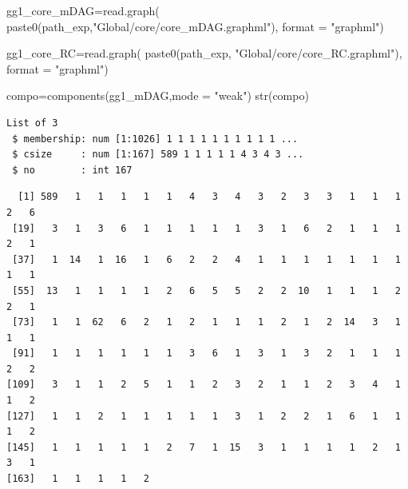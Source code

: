 \documentclass[
  letterpaper,
  DIV=11,
  numbers=noendperiod]{scrreprt}
\newenvironment{Shaded}{\begin{snugshade}}{\end{snugshade}}
\newcommand{\AttributeTok}[1]{\textcolor[rgb]{0.40,0.45,0.13}{#1}}
\newcommand{\FunctionTok}[1]{\textcolor[rgb]{0.28,0.35,0.67}{#1}}
\newcommand{\NormalTok}[1]{\textcolor[rgb]{0.00,0.23,0.31}{#1}}
\newcommand{\OtherTok}[1]{\textcolor[rgb]{0.00,0.23,0.31}{#1}}
\newcommand{\SpecialCharTok}[1]{\textcolor[rgb]{0.37,0.37,0.37}{#1}}
\newcommand{\StringTok}[1]{\textcolor[rgb]{0.13,0.47,0.30}{#1}}
\begin{document}
\begin{Shaded}
\begin{Highlighting}[]
\NormalTok{gg1\_core\_mDAG}\OtherTok{=}\FunctionTok{read.graph}\NormalTok{(}
  \FunctionTok{paste0}\NormalTok{(path\_exp,}\StringTok{"Global/core/core\_mDAG.graphml"}\NormalTok{), }\AttributeTok{format =} \StringTok{"graphml"}\NormalTok{)}

\NormalTok{gg1\_core\_RC}\OtherTok{=}\FunctionTok{read.graph}\NormalTok{(}
  \FunctionTok{paste0}\NormalTok{(path\_exp,                    }\StringTok{"Global/core/core\_RC.graphml"}\NormalTok{), }\AttributeTok{format =} \StringTok{"graphml"}\NormalTok{)}
\end{Highlighting}
\end{Shaded}

\begin{Shaded}
\begin{Highlighting}[]
\NormalTok{compo}\OtherTok{=}\FunctionTok{components}\NormalTok{(gg1\_mDAG,}\AttributeTok{mode =} \StringTok{"weak"}\NormalTok{)}
\FunctionTok{str}\NormalTok{(compo)}
\end{Highlighting}
\end{Shaded}

\begin{verbatim}
List of 3
 $ membership: num [1:1026] 1 1 1 1 1 1 1 1 1 1 ...
 $ csize     : num [1:167] 589 1 1 1 1 1 4 3 4 3 ...
 $ no        : int 167
\end{verbatim}

\begin{Shaded}
\end{Shaded}

\begin{verbatim}
  [1] 589   1   1   1   1   1   4   3   4   3   2   3   3   1   1   1   2   6
 [19]   3   1   3   6   1   1   1   1   1   3   1   6   2   1   1   1   2   1
 [37]   1  14   1  16   1   6   2   2   4   1   1   1   1   1   1   1   1   1
 [55]  13   1   1   1   1   2   6   5   5   2   2  10   1   1   1   2   2   1
 [73]   1   1  62   6   2   1   2   1   1   1   2   1   2  14   3   1   1   1
 [91]   1   1   1   1   1   1   3   6   1   3   1   3   2   1   1   1   2   2
[109]   3   1   1   2   5   1   1   2   3   2   1   1   2   3   4   1   1   2
[127]   1   1   2   1   1   1   1   1   3   1   2   2   1   6   1   1   1   2
[145]   1   1   1   1   1   2   7   1  15   3   1   1   1   1   2   1   3   1
[163]   1   1   1   1   2
\end{verbatim}
\end{document}
